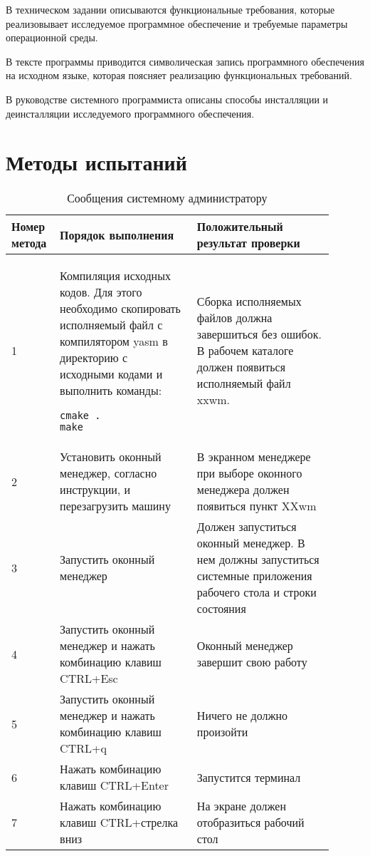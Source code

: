 \documentclass[10pt,a4paper]{report}
\begin{document}
В техническом задании описываются функциональные требования,  которые реализовывает исследуемое программное обеспечение и требуемые параметры операционной среды.
		
В тексте программы приводится символическая запись программного обеспечения на исходном языке, которая поясняет реализацию функциональных требований.
		
В руководстве системного программиста описаны способы инсталляции и деинсталляции исследуемого программного обеспечения.
		
\section{Методы испытаний}
\begin{table}[H]
\caption{Сообщения системному администратору}
\label{tabular:timesandtenses}
\begin{center}
\begin{tabular}{| p{0.1\linewidth} | p{0.4\linewidth} | p{0.4\linewidth} |}
\hline
\textbf{Номер метода} & \textbf{Порядок выполнения} & \textbf{Положительный результат проверки} \\
\hline
1 & Компиляция исходных кодов. Для этого необходимо скопировать  исполняемый файл с компилятором yasm в директорию с исходными кодами и выполнить команды: 
\begin{verbatim}
cmake .
make
\end{verbatim} &  Сборка исполняемых файлов должна завершиться без ошибок. В рабочем каталоге должен появиться исполняемый файл xxwm.\\
\hline
2 & Установить оконный менеджер, согласно инструкции, и перезагрузить машину &  В экранном менеджере при выборе оконного менеджера должен появиться пункт XXwm\\
\hline
3 & Запустить оконный менеджер & Должен запуститься оконный менеджер. В нем должны запуститься системные приложения рабочего стола и строки состояния\\
\hline
4 & Запустить оконный менеджер и нажать комбинацию клавиш CTRL+Esc & Оконный менеджер завершит свою работу\\
\hline
5 & Запустить оконный менеджер и нажать комбинацию клавиш CTRL+q & Ничего не должно произойти \\
\hline
6 & Нажать комбинацию клавиш CTRL+Enter & Запустится терминал\\
\hline
7 & Нажать комбинацию клавиш CTRL+стрелка вниз & На экране должен отобразиться рабочий стол\\

\end{tabular}
\end{center}
\end{table}
\end{document}
